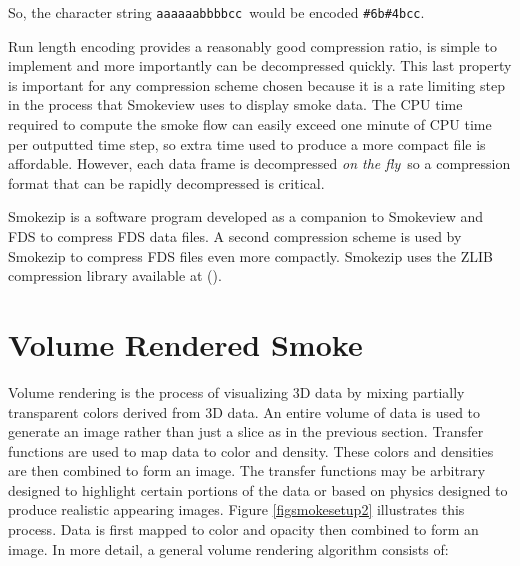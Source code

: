 So, the character string {\tt aaaaaabbbbcc}\ would be encoded {\tt \#6b\#4bcc}.

Run length encoding provides a reasonably good compression ratio, is simple to implement and more importantly can be decompressed quickly. This last property is important for any compression scheme chosen because it is a rate limiting step in the process that Smokeview uses to display smoke data. The CPU time required to compute the smoke flow can easily exceed one minute of CPU time
per outputted time step, so extra time used to produce a more compact file is affordable. However, each data frame is decompressed {\em on the fly}\ so a compression format that can be rapidly decompressed is critical.

Smokezip is a software program developed as a companion to Smokeview and FDS to compress FDS data files. A second compression scheme is used by Smokezip to compress FDS files even more compactly.  Smokezip uses the ZLIB compression library available at ().

%
%

\section{Volume Rendered Smoke}
Volume rendering is the process of visualizing 3D data by mixing partially transparent colors derived from 3D data.  An entire volume of data is used to generate an image rather than just a slice as in the previous section.  Transfer functions are used to map data to color and density.  These colors and densities are then combined to form an image.  The transfer functions may be arbitrary designed to highlight certain portions of the data or based on physics designed to produce realistic appearing images.  Figure \ref{figsmokesetup2} illustrates this process.  Data is first mapped to color and opacity then combined to form an image.  In more detail, a general volume rendering algorithm consists of:

